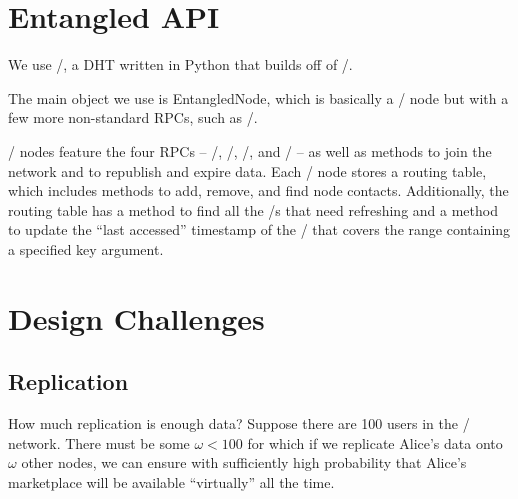 \documentclass[11pt,twocolumn]{article}
\begin{document}
\section{Entangled API}
\label{sec:entangled}
We use \Entangled/, a DHT written in Python that builds off of \Kademlia/.

The main object we use is {\sc EntangledNode}, which is basically a \Kademlia/ node but with a few more non-standard RPCs, such as \delete/.

\Kademlia/ nodes feature the four RPCs -- \ping/, \store/, \findValue/, and \findNode/ -- as well as methods to join the network and to republish and expire data.
Each \Kademlia/ node stores a routing table, which includes methods to add, remove, and find node contacts. Additionally, the routing table has a method to find all the \kbucket/s that need refreshing and a method to update the ``last accessed'' timestamp of the \kbucket/ that covers the range containing a specified key argument.






\section{Design Challenges}
\label{sec:design_challenges}

\subsection{Replication}
\label{subsec:design_challenges_replication}

How much replication is enough data?
Suppose there are 100 users in the \OpenBazaar/ network.
There must be some $\omega < 100$ for which if we replicate Alice's data onto $\omega$ other nodes, we can ensure with sufficiently high probability that Alice's marketplace will be available ``virtually'' all the time.
\end{document}
